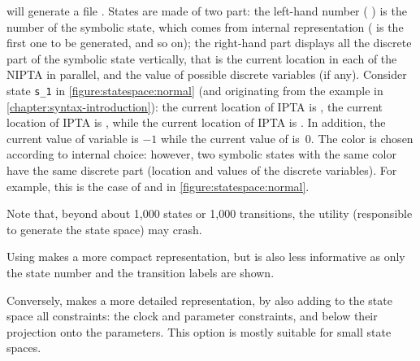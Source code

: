 \imitator{} will generate a file .
States are made of two part: the left-hand number (\eg{} ) is the number of the symbolic state, which comes from \imitator{} internal representation ( is the first one to be generated, and so on); the right-hand part displays all the discrete part of the symbolic state vertically, that is the current location in each of the NIPTA in parallel, and the value of possible discrete variables (if any).
Consider state \texttt{s\_1} in \cref{figure:statespace:normal} (and originating from the example in \cref{chapter:syntax-introduction}):
the current location of IPTA  is ,
the current location of IPTA  is ,
while
the current location of IPTA  is .
In addition, the current value of variable  is $-1$ while the current value of  is~0.
The color is chosen according to \imitator{} internal choice: however, two symbolic states with the same color have the same discrete part (location and values of the discrete variables).
For example, this is the case of  and  in \cref{figure:statespace:normal}.

Note that, beyond about 1,000 states or 1,000 transitions, the \gdot{} utility (responsible to generate the state space) may crash.

Using  makes a more compact representation, but is also less informative as only the state number and the transition labels are shown.

Conversely,  makes a more detailed representation, by also adding to the state space all constraints:
the clock and parameter constraints, and below their projection onto the parameters.
This option is mostly suitable for small state spaces.

